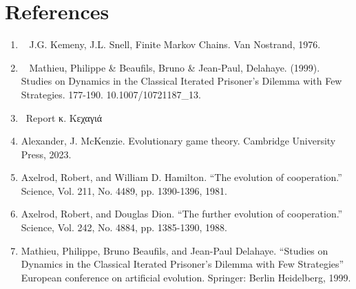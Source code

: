 \section*{References}
\begin{enumerate}
  \item \ \label{kex} J.G. Kemeny, J.L. Snell, Finite Markov Chains. Van Nostrand, 1976.
\item \ \label{paper} Mathieu, Philippe \& Beaufils, Bruno \& Jean-Paul, Delahaye. (1999). Studies on Dynamics in the Classical Iterated Prisoner’s Dilemma with Few Strategies. 177-190. 10.1007/10721187\_13.
\item  \ Report κ. Κεχαγιά
\item  Alexander, J. McKenzie. Evolutionary game theory. Cambridge University Press, 2023.
\item Axelrod, Robert, and William D. Hamilton. “The evolution of cooperation.” Science, Vol.
211, No. 4489, pp. 1390-1396, 1981.
\item Axelrod, Robert, and Douglas Dion. “The further evolution of cooperation.” Science, Vol.
242, No. 4884, pp. 1385-1390, 1988.
\item Mathieu, Philippe, Bruno Beaufils, and Jean-Paul Delahaye. “Studies on Dynamics in the
Classical Iterated Prisoner’s Dilemma with Few Strategies” European conference on artificial
evolution. Springer: Berlin Heidelberg, 1999.
\end{enumerate}
